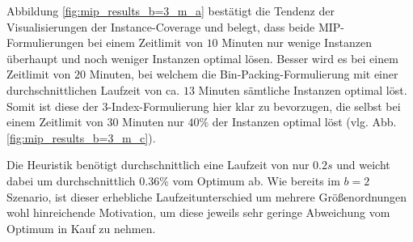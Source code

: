Abbildung \ref{fig:mip_results_b=3_m_a} bestätigt die Tendenz der Visualisierungen der Instance-Coverage und belegt,
dass beide MIP-Formulierungen bei einem Zeitlimit von $10$ Minuten nur wenige Instanzen überhaupt und noch weniger
Instanzen optimal lösen.
Besser wird es bei einem Zeitlimit von $20$ Minuten, bei welchem die Bin-Packing-Formulierung mit einer durchschnittlichen
Laufzeit von ca. $13$ Minuten sämtliche Instanzen optimal löst. Somit ist diese der 3-Index-Formulierung hier klar zu bevorzugen,
die selbst bei einem Zeitlimit von $30$ Minuten nur $40 \%$ der Instanzen optimal löst (vlg. Abb. \ref{fig:mip_results_b=3_m_c}).

Die Heuristik benötigt durchschnittlich eine Laufzeit von nur $0.2s$ und weicht dabei um durchschnittlich
$0.36 \%$ vom Optimum ab. Wie bereits im $b = 2$ Szenario, ist dieser erhebliche Laufzeitunterschied
um mehrere Größenordnungen wohl hinreichende Motivation, um diese jeweils sehr geringe Abweichung vom Optimum in Kauf zu nehmen.

